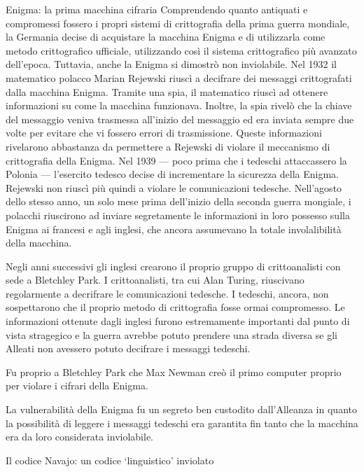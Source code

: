 \documentclass[final,hyperref={pdfpagelabels=false}]{beamer}
\begin{document}
\begin{frame}{}
\begin{columns}[t]
\begin{column}{.3\linewidth}
\begin{block}{Enigma: la prima macchina cifraria}
          Comprendendo quanto antiquati e compromessi fossero i propri sistemi di crittografia della prima guerra mondiale, la Germania decise di acquistare la macchina Enigma e di utilizzarla come metodo crittografico ufficiale, utilizzando così il sistema crittografico più avanzato dell'epoca. Tuttavia, anche la Enigma si dimostrò non inviolabile. Nel 1932 il matematico polacco Marian Rejewski riuscì a decifrare dei messaggi crittografati dalla macchina Enigma. Tramite una spia, il matematico riuscì ad ottenere informazioni su come la macchina funzionava. Inoltre, la spia rivelò che la chiave del messaggio veniva trasmessa all'inizio del messaggio ed era inviata sempre due volte per evitare che vi fossero errori di trasmissione. Queste informazioni rivelarono abbastanza da permettere a Rejewski di violare il meccanismo di crittografia della Enigma. Nel 1939 --- poco prima che i tedeschi attaccassero la Polonia --- l'esercito tedesco decise di incrementare la sicurezza della Enigma. Rejewski non riuscì più quindi a violare le comunicazioni tedesche. Nell'agosto dello stesso anno, un solo mese prima dell'inizio della seconda guerra mongiale, i polacchi riuscirono ad inviare segretamente le informazioni in loro possesso sulla Enigma ai francesi e agli inglesi, che ancora assumevano la totale involalibilità della macchina. \par
          Negli anni successivi gli inglesi crearono il proprio gruppo di crittoanalisti con sede a Bletchley Park. I crittoanalisti, tra cui Alan Turing, riuscivano regolarmente a decrifrare le comunicazioni tedesche. I tedeschi, ancora, non sospettarono che il proprio metodo di crittografia fosse ormai compromesso. Le informazioni ottenute dagli inglesi furono estremamente importanti dal punto di vista stragegico e la guerra avrebbe potuto prendere una strada diversa se gli Alleati non avessero potuto decifrare i messaggi tedeschi. \par
          Fu proprio a Bletchley Park che Max Newman creò il primo computer proprio per violare i cifrari della Enigma.\par
          La vulnerabilità della Enigma fu un segreto ben custodito dall'Alleanza in quanto la possibilità di leggere i messaggi tedeschi era garantita fin tanto che la macchina era da loro considerata inviolabile.
        \end{block}
        \begin{block}{Il codice Navajo: un codice `linguistico' inviolato}

\end{block}
\end{column}
\end{columns}
\end{frame}
\end{document}
